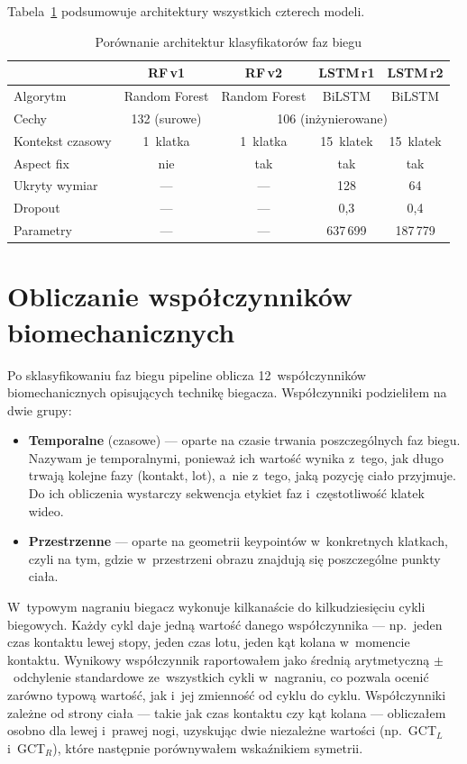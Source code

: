 Tabela~\ref{tab:classifiers} podsumowuje architektury wszystkich czterech modeli.

\begin{table}[htbp]
\centering
\caption{Porównanie architektur klasyfikatorów faz biegu}
\label{tab:classifiers}
\small
\begin{tabular}{lcccc}
\hline
 & \textbf{RF\,v1} & \textbf{RF\,v2} & \textbf{LSTM\,r1} & \textbf{LSTM\,r2} \\
\hline
Algorytm       & Random Forest & Random Forest & BiLSTM & BiLSTM \\
Cechy           & 132 (surowe) & \multicolumn{3}{c}{106 (inżynierowane)} \\
Kontekst czasowy & 1~klatka & 1~klatka & 15~klatek & 15~klatek \\
Aspect fix      & nie & tak & tak & tak \\
Ukryty wymiar   & --- & --- & 128 & 64 \\
Dropout         & --- & --- & 0{,}3 & 0{,}4 \\
Parametry       & --- & --- & 637\,699 & 187\,779 \\
\hline
\end{tabular}
\end{table}

\section{Obliczanie współczynników biomechanicznych}
\label{sec:obliczanie-wspolczynnikow}

Po sklasyfikowaniu faz biegu pipeline oblicza 12~współczynników biomechanicznych opisujących technikę biegacza. Współczynniki podzieliłem na dwie grupy:

\begin{itemize}
    \item \textbf{Temporalne} (czasowe) --- oparte na czasie trwania poszczególnych faz biegu. Nazywam je temporalnymi, ponieważ ich wartość wynika z~tego, jak długo trwają kolejne fazy (kontakt, lot), a~nie z~tego, jaką pozycję ciało przyjmuje. Do ich obliczenia wystarczy sekwencja etykiet faz i~częstotliwość klatek wideo. 
    \item \textbf{Przestrzenne} --- oparte na geometrii keypointów w~konkretnych klatkach, czyli na tym, gdzie w~przestrzeni obrazu znajdują się poszczególne punkty ciała. 
\end{itemize}

W~typowym nagraniu biegacz wykonuje kilkanaście do kilkudziesięciu cykli biegowych. Każdy cykl daje jedną wartość danego współczynnika --- np.~jeden czas kontaktu lewej stopy, jeden czas lotu, jeden kąt kolana w~momencie kontaktu. Wynikowy współczynnik raportowałem jako średnią arytmetyczną $\pm$~odchylenie standardowe ze~wszystkich cykli w~nagraniu, co pozwala ocenić zarówno typową wartość, jak i~jej zmienność od cyklu do cyklu. Współczynniki zależne od strony ciała --- takie jak czas kontaktu czy kąt kolana --- obliczałem osobno dla lewej i~prawej nogi, uzyskując dwie niezależne wartości (np.~GCT$_L$ i~GCT$_R$), które następnie porównywałem wskaźnikiem symetrii.

